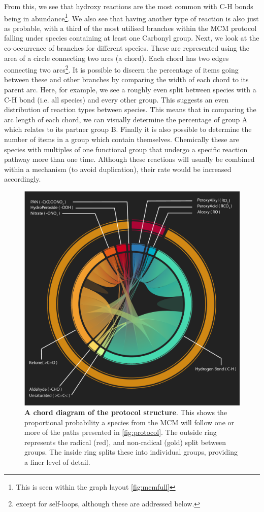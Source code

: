 From this, we see that hydroxy reactions are the most common with C-H bonds being in abundance\footnote{This is seen within the graph layout \autoref{fig:mcmfull}}. We also see that having another type of reaction is also just as probable, with a third of the most utilised branches within the MCM protocol falling under species containing at least one Carbonyl group.
Next, we look at the co-occurrence of branches for different species. These are represented using the area of a circle connecting two arcs (a chord). Each chord has two edges connecting two arcs\footnote{ except for self-loops, although these are addressed below.}.  It is possible to discern the percentage of items going between these and other branches by comparing the width of each chord to its parent arc. Here, for example, we see a roughly even split between species with a C-H bond (i.e. all species) and every other group. This suggests an even distribution of reaction types between species.
This means that in comparing the arc length of each chord, we can visually determine the percentage of group A which relates to its partner group B. Finally it is also possible to determine the number of items in a group which contain themselves. Chemically these are species with multiples of one functional group that undergo a specific reaction pathway more than one time. Although these reactions will usually be combined within a mechanism (to avoid duplication), their rate would be increased accordingly.

\begin{figure}[H]
     \centering
     \includegraphics[width=\textwidth]{figures_c1/radicallayermcmgen.pdf}
        \caption{\textbf{A chord diagram of the protocol structure}. This shows the proportional probability a species from the MCM will follow one or more of the paths presented in \autoref{fig:protocol}. The outside ring represents the radical (red), and non-radical (gold) split between groups. The inside ring splits these into individual groups, providing a finer level of detail. }
        \label{fig:chord}
\end{figure}


